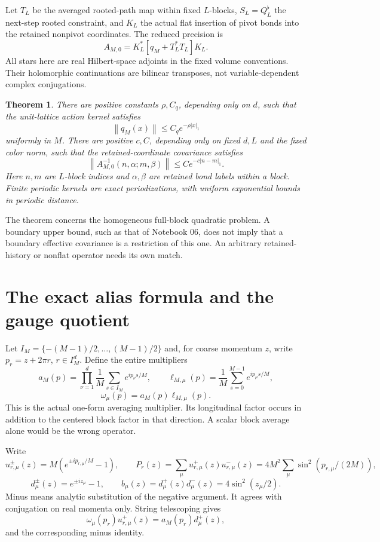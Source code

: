 \documentclass[11pt]{article}
\newtheorem{theorem}{Theorem}[section]
\theoremstyle{remark}
\newcommand{\norm}[1]{\left\|#1\right\|}
\begin{document}
Let $T_L$ be the averaged rooted-path map within fixed $L$-blocks,
$S_L=Q_L^\flat$ the next-step rooted constraint, and $K_L$ the
actual flat insertion of pivot bonds into the retained nonpivot
coordinates. The reduced precision is
\begin{equation}\label{eq:reduced}
 A_{M,0}=K_L^*[q_M+T_L^*T_L]K_L.
\end{equation}
All stars here are real Hilbert-space adjoints in the fixed volume
conventions. Their holomorphic continuations are bilinear transposes,
not variable-dependent complex conjugations.

\begin{theorem}\label{thm:flat-decay}
There are positive constants $\rho,C_q$, depending only on $d$, such that
the unit-lattice action kernel satisfies
\[
 \norm{q_M(x)}\le C_qe^{-\rho|x|_1}
\]
uniformly in $M$. There are positive $c,C$, depending only on fixed
$d,L$ and the fixed color norm, such that the retained-coordinate
covariance satisfies
\[
 \norm{A_{M,0}^{-1}(n,\alpha;m,\beta)}
 \le Ce^{-c|n-m|_1}.
\]
Here $n,m$ are $L$-block indices and $\alpha,\beta$ are retained
bond labels within a block. Finite periodic kernels are exact
periodizations, with uniform exponential bounds in periodic distance.
\end{theorem}

The theorem concerns the homogeneous full-block quadratic problem.
A boundary upper bound, such as that of Notebook 06, does not imply
that a boundary effective covariance is a restriction of this one.
An arbitrary retained-history or nonflat operator needs its own match.

\section{The exact alias formula and the gauge quotient}

Let $I_M=\{-(M-1)/2,\ldots,(M-1)/2\}$ and, for coarse momentum
$z$, write $p_r=z+2\pi r$, $r\in I_M^d$. Define the entire multipliers
\[
 a_M(p)=\prod_{\nu=1}^d\frac1M\sum_{s\in I_M}e^{ip_\nu s/M},
 \qquad
 \ell_{M,\mu}(p)=\frac1M\sum_{s=0}^{M-1}e^{ip_\mu s/M},
\]
\[
 \omega_\mu(p)=a_M(p)\ell_{M,\mu}(p).
\]
This is the actual one-form averaging multiplier. Its longitudinal
factor occurs in addition to the centered block factor in that
direction. A scalar block average alone would be the wrong operator.

Write
\[
 u_{r,\mu}^{\pm}(z)=M(e^{\pm ip_{r,\mu}/M}-1),\qquad
 P_r(z)=\sum_\mu u_{r,\mu}^+(z)u_{r,\mu}^-(z)
       =4M^2\sum_\mu\sin^2(p_{r,\mu}/(2M)),
\]
\[
 d_\mu^\pm(z)=e^{\pm iz_\mu}-1,\qquad
 b_\mu(z)=d_\mu^+(z)d_\mu^-(z)=4\sin^2(z_\mu/2).
\]
Minus means analytic substitution of the negative argument. It agrees
with conjugation on real momenta only. String telescoping gives
\begin{equation}\label{eq:gradient-symbol}
 \omega_\mu(p_r)u_{r,\mu}^+(z)=a_M(p_r)d_\mu^+(z),
\end{equation}
and the corresponding minus identity.
\end{document}
